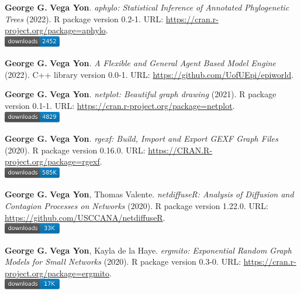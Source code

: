 \item \textbf{George G.} \textbf{Vega Yon}. \textit{aphylo: Statistical Inference of Annotated Phylogenetic Trees} (2022). R package version 0.2-1. {\small URL}: \url{https://cran.r-project.org/package=aphylo}. \\\includegraphics[width=2.5cm]{fig/cran-downloads-aphylo.pdf} 
\item \textbf{George G.} \textbf{Vega Yon}. \textit{A Flexible and General Agent Based Model Engine} (2022). C++ library version 0.0-1. {\small URL}: \url{https://github.com/UofUEpi/epiworld}.  
\item \textbf{George G.} \textbf{Vega Yon}. \textit{netplot: Beautiful graph drawing} (2021). R package version 0.1-1. {\small URL}: \url{https://cran.r-project.org/package=netplot}. \\\includegraphics[width=2.5cm]{fig/cran-downloads-netplot.pdf} 
\item \textbf{George G.} \textbf{Vega Yon}. \textit{rgexf: Build, Import and Export GEXF Graph Files} (2020). R package version 0.16.0. {\small URL}: \url{https://CRAN.R-project.org/package=rgexf}. \\\includegraphics[width=2.5cm]{fig/cran-downloads-rgexf.pdf} 
\item \textbf{George G.} \textbf{Vega Yon}, Thomas Valente. \textit{{{netdiffuseR: Analysis of Diffusion and Contagion Processes on Networks}}} (2020). R package version 1.22.0. {\small URL}: \url{https://github.com/USCCANA/netdiffuseR}. \\\includegraphics[width=2.5cm]{fig/cran-downloads-netdiffuser.pdf} 
\item \textbf{George G.} \textbf{Vega Yon}, Kayla de la Haye. \textit{ergmito: Exponential Random Graph Models for Small Networks} (2020). R package version 0.3-0. {\small URL}: \url{https://cran.r-project.org/package=ergmito}. \\\includegraphics[width=2.5cm]{fig/cran-downloads-ergmito.pdf} 
